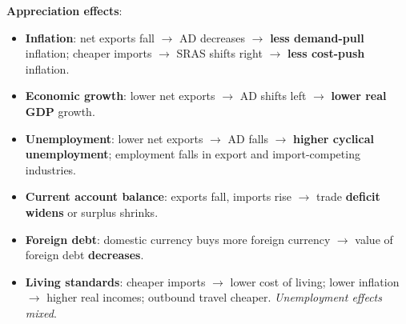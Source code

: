 \documentclass[a4paper,12pt]{article}
\begin{document}
\textbf{Appreciation effects}:
\begin{itemize}
  \item \textbf{Inflation}: net exports fall $\to$ AD decreases $\to$ \textbf{less demand-pull} inflation; cheaper imports $\to$ SRAS shifts right $\to$ \textbf{less cost-push} inflation.
  \item \textbf{Economic growth}: lower net exports $\to$ AD shifts left $\to$ \textbf{lower real GDP} growth.
  \item \textbf{Unemployment}: lower net exports $\to$ AD falls $\to$ \textbf{higher cyclical unemployment}; employment falls in export and import-competing industries.
  \item \textbf{Current account balance}: exports fall, imports rise $\to$ trade \textbf{deficit widens} or surplus shrinks.
  \item \textbf{Foreign debt}: domestic currency buys more foreign currency $\to$ value of foreign debt \textbf{decreases}.
  \item \textbf{Living standards}: cheaper imports $\to$ lower cost of living; lower inflation $\to$ higher real incomes; outbound travel cheaper. \textit{Unemployment effects mixed}.
\end{itemize}
\end{document}
